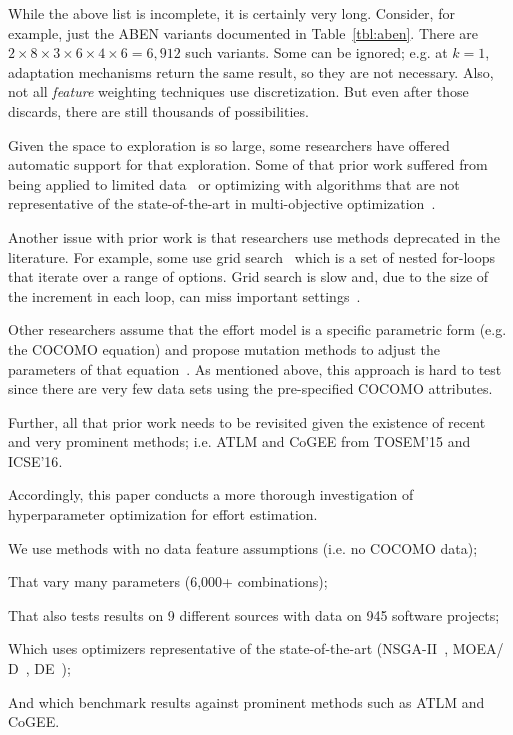 While the above list is incomplete, it is certainly very long. Consider, for example, just the ABEN
variants documented in Table~\ref{tbl:aben}. There are 
$2\times 8\times 3\times 6\times 4\times 6=6,912$ such variants.  Some   can be ignored;
e.g. at $k=1$,     adaptation mechanisms return the same result, so they are not necessary. Also, not all  {\em feature} weighting techniques use discretization. But even after those discards, there are still thousands of possibilities. 

Given the space to exploration is so large, some researchers have offered automatic support for that exploration.
Some of that prior work suffered from being applied to limited data~\cite{li09} or optimizing
with algorithms that are not representative of  the state-of-the-art in multi-objective optimization~\cite{li09}.

Another issue with prior work is that researchers use methods  deprecated in the literature. 
For example,  some use grid search~\cite{dejaeger12,Song:2013}  which is a set of
nested for-loops that iterate over  a range of options.
Grid search is  slow and, due to the size of the increment in each loop, can miss important settings~\cite{Bergstra:2012}.

Other researchers assume that the effort model is a specific parametric form (e.g. the COCOMO equation)
and propose mutation methods to adjust the parameters of that equation~\cite{aljahdali2010software,Moeyersoms:2015,singh2012software,IJST70010,Rao14}. As mentioned above, this approach is
hard to test since there are very few data sets using the   pre-specified COCOMO attributes. 

Further, all that prior work needs to be revisited given the existence of recent and very prominent
methods; i.e. ATLM and CoGEE from TOSEM'15 and ICSE'16\cite{Whigham:2015,sarro2016multi}.


Accordingly, this paper conducts a  more thorough investigation of   hyperparameter optimization for effort estimation. 
\bi
\item
We  use methods with no   data
feature assumptions (i.e. no COCOMO data);
\item
That
 vary
many   parameters (6,000+ combinations);
\item
That also  tests  results   on 9 different sources with data on 945 software projects; 
\item
Which  uses optimizers   representative of the  state-of-the-art 
(NSGA-II~\cite{deb02}, MOEA/ D~\cite{Zhang07}, DE~\cite{storn1997differential});
\item
And which 
benchmark results 
against  prominent methods such as 
  ATLM and CoGEE.
\ei


